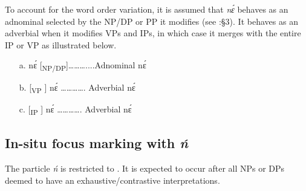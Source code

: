 \documentclass[output=paper
,newtxmath
,modfonts
,nonflat]{langsci/langscibook}
\begin{document}
To account for the word order variation, it is assumed that \textit{nɛ́} behaves as an adnominal selected by the NP/DP or PP it modifies (see \citealt{renans2016}:§3). It behaves as an adverbial when it modifies VPs and IPs, in which case it merges with the entire IP or VP as illustrated below. 

 
\begin{itemize}
\item[a.] nɛ́ [\textsubscript{NP/DP}]………....Adnominal nɛ́
\item[b.] [\textsubscript{VP} ] nɛ́ …………. Adverbial nɛ́ 
\item[c.]  [\textsubscript{IP} ] nɛ́ …………. Adverbial nɛ́ 
\end{itemize}

\subsection{In-situ focus marking with \textit{ń}}

The particle \textit{ń} is restricted to  . It is expected to occur after all  NPs or DPs deemed to have an exhaustive/contrastive  interpretations.
\end{document}
